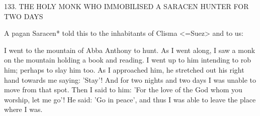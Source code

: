 133. THE HOLY MONK WHO IMMOBILISED A
SARACEN HUNTER FOR TWO DAYS

A pagan Saracen* told this to the inhabitants of Clisma <=Suez>
and to us:

I went to the mountain of Abba Anthony to hunt. As I went along,
I saw a monk on the mountain holding a book and reading. I went
up to him intending to rob him; perhaps to slay him too. As I
approached him, he stretched out his right hand towards me saying:
'Stay'! And for two nights and two days I was unable to move from
that spot. Then I said to him: 'For the love of the God whom you
worship, let me go'! He said: 'Go in peace', and thus I was able to
leave the place where I was.

